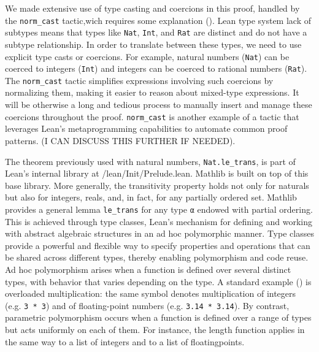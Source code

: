We made extensive use of type casting and coercions in this proof, handled by 
the \lstinline[language=lean]|norm_cast| tactic,wich requires some explanation (\cite{lewis_madelaine_simplifying_casts_coercions_2020}).
Lean type system lack of subtypes means that types like \lstinline[language=lean]|Nat|, 
\lstinline[language=lean]|Int|, and \lstinline[language=lean]|Rat|
are distinct and do not have a subtype relationship.
In order to translate between these types, we need to use explicit type casts or coercions.
For example, natural numbers (\lstinline[language=lean]|Nat|) can be coerced to integers (\lstinline[language=lean]|Int|) and integers can be coerced
to rational numbers (\lstinline[language=lean]|Rat|).
The \lstinline[language=lean]|norm_cast| tactic simplifies expressions involving such coercions
by normalizing them, making it easier to reason about mixed-type expressions.
It  will be otherwise a long and tedious process to manually insert and manage 
these coercions throughout the proof.
\lstinline[language=lean]|norm_cast| is another example of a tactic that leverages 
Lean's metaprogramming capabilities to automate common proof patterns. 
(I CAN DISCUSS THIS FURTHER IF NEEDED).

The theorem previously used with natural numbers, \lstinline[language=lean]|Nat.le_trans|, 
is part of Lean’s internal library at /lean/Init/Prelude.lean. 
Mathlib is built on top of this base library.
More generally, the transitivity property holds not only for naturals but also for integers, 
reals, and, in fact, for any partially ordered set. 
Mathlib provides a general lemma \lstinline[language=lean]|le_trans| for any type 
\lstinline[language=lean]|α| endowed with partial ordering.
This is achieved through type classes, Lean’s mechanism for defining and working with 
abstract algebraic structures in an ad hoc polymorphic manner.
Type classes provide a powerful and flexible way to specify properties and 
operations that can be shared across different types, thereby enabling 
polymorphism and code reuse.
Ad hoc polymorphism arises when a function is defined over several distinct types, 
with behavior that varies depending on the type. A standard example (\cite{wadler_blott_ad_hoc_polymorphism_1988}) is overloaded 
multiplication: the same symbol denotes multiplication of integers 
(e.g. \lstinline[language=lean]|3 * 3|) and of floating-point numbers 
(e.g. \lstinline[language=lean]|3.14 * 3.14|).
By contrast, parametric polymorphism occurs when a function is defined over a 
range of types but acts uniformly on each of them. For instance, the length 
function applies in the same way to a list of integers and to a list of 
floatingpoints.

